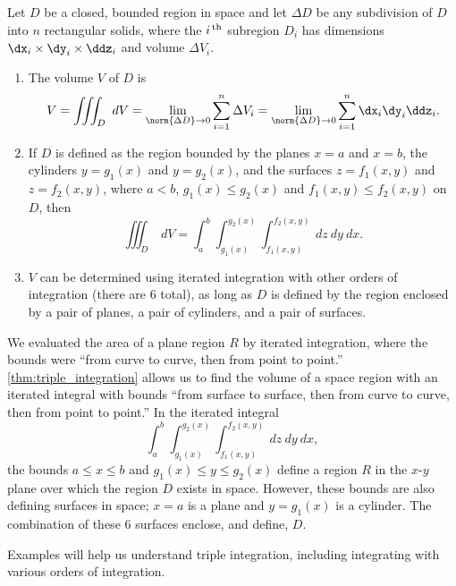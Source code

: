 {Let $D$ be a closed, bounded region in space and let $\Delta D$ be any subdivision of $D$ into $n$ rectangular solids, where the  $i^\text{\,th}$ subregion $D_i$ has dimensions $\dx_i\times\dy_i\times\ddz_i$ and volume $\Delta V_i$.
\begin{enumerate}
	\item	The volume $V$ of $D$ is
	$$V = \iiint_D\ dV = \lim_{\norm{\Delta D}\to0} \sum_{i=1}^n \Delta V_i = \lim_{\norm{\Delta D}\to0} \sum_{i=1}^n \dx_i\dy_i\ddz_i.$$

	\item	If $D$ is defined as the region bounded by the planes $x=a$ and $x=b$, the cylinders $y=g_1(x)$ and $y=g_2(x)$, and the surfaces $z=f_1(x,y)$ and $z=f_2(x,y)$, where $a<b$, $g_1(x)\leq g_2(x)$ and $f_1(x,y)\leq f_2(x,y)$ on $D$, then
	$$\iiint_D \ dV = \int_a^b\int_{g_1(x)}^{g_2(x)}\int_{f_1(x,y)}^{f_2(x,y)} \ dz\ dy\ dx.$$

	\item	$V$ can be determined using iterated integration with other orders of integration (there are 6 total), as long as $D$ is defined by the region enclosed by a pair of planes, a pair of cylinders, and a pair of surfaces.
\end{enumerate}}

We evaluated the area of a plane region $R$ by iterated integration, where the bounds were ``from curve to curve, then from point to point.'' \autoref{thm:triple_integration} allows us to find the volume of a space region with an iterated integral with bounds ``from surface to surface, then from curve to curve, then from point to point.'' In the iterated integral 
$$\int_a^b\int_{g_1(x)}^{g_2(x)}\int_{f_1(x,y)}^{f_2(x,y)} \ dz\ dy\ dx,$$
the bounds $a\leq x\leq b$ and $g_1(x)\leq y\leq g_2(x)$ define a region $R$ in the $x$-$y$ plane over which the region $D$ exists in space. However, these bounds are also defining surfaces in space; $x=a$ is a plane and $y=g_1(x)$ is a cylinder. The combination of these 6 surfaces enclose, and define, $D$.

Examples will help us understand triple integration, including integrating with various orders of integration.

